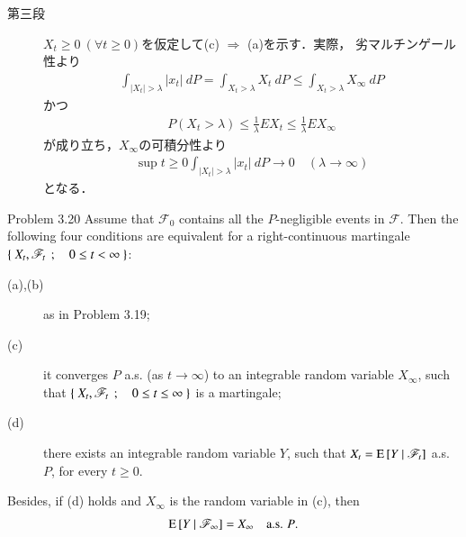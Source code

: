 \begin{prf}
\begin{description}
			\item[第三段]
				$X_t \geq 0\ (\forall t \geq 0)$を仮定して(c) $\Rightarrow$ (a)を示す．実際，
				劣マルチンゲール性より
				\begin{align}
					\int_{|X_t| > \lambda} |x_t|\ dP
					= \int_{X_t > \lambda} X_t\ dP
					\leq \int_{X_t > \lambda} X_\infty\ dP
				\end{align}
				かつ
				\begin{align}
					P\left( X_t > \lambda \right)
					\leq \frac{1}{\lambda} EX_t
					\leq \frac{1}{\lambda} EX_\infty
				\end{align}
				が成り立ち，$X_\infty$の可積分性より
				\begin{align}
					\sup{t \geq 0}{\int_{|X_t| > \lambda} |x_t|\ dP} 
					\longrightarrow 0
					\quad (\lambda \longrightarrow \infty)
				\end{align}
				となる．
				\QED
		\end{description}
	\end{prf}
	
	\begin{itembox}[l]{Problem 3.20}
		Assume that $\mathscr{F}_0$ contains all the $P$-negligible events in $\mathscr{F}$.
		Then the following four conditions are equivalent for a right-continuous martingale
		$\left\{\ X_t,\mathscr{F}_t\ \, ; \quad 0 \leq t < \infty\ \right\}$:
		\begin{description}
			\item[(a),(b)] as in Problem 3.19;
			\item[(c)] it converges $P$ a.s. (as $t \to \infty$) to an integrable random variable $X_\infty$,
				such that $\left\{\ X_t,\mathscr{F}_t\ \, ; \quad 0 \leq t \leq \infty\ \right\}$ is a martingale;
			\item[(d)] there exists an integrable random variable $Y$, such that $X_t = \operatorname{E} \left[ Y \ \middle|\ \mathscr{F}_t \right]$ a.s. $P$,
				for every $t \geq 0$.
		\end{description}
		Besides, if (d) holds and $X_\infty$ is the random variable in (c), then
		\begin{align}
			\operatorname{E} \left[ Y \ \middle|\ \mathscr{F}_\infty \right] = X_\infty
			\quad \mbox{a.s. $P$}.
			\label{eq:chapter_1_Problem_3_20_1}
		\end{align}
	\end{itembox}
	
